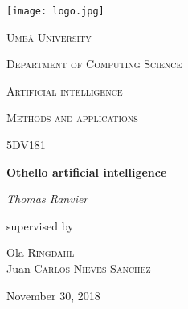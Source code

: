 \begin{titlepage}
    \centering
    \texttt{[image: logo.jpg]} \par\vspace{1cm}
    {\scshape\LARGE Umeå University \par}
    {\scshape\Large Department of Computing Science\par}
    \vspace{1cm}
    {\scshape\Large Artificial intelligence\par}
    {\scshape\Large Methods and applications\par}
    \vspace{0.5cm}
    {\scshape\large 5DV181\par}
    \vspace{1.5cm}
    {\huge\bfseries Othello artificial intelligence\par}
    \vspace{2cm}
    {\Large\itshape Thomas Ranvier\par}
    \vfill 
    {\large supervised by\par}
    Ola \textsc{Ringdahl}
    \\
    Juan \textsc{Carlos Nieves Sanchez}
    \vfill 
    {\large November 30, 2018\par}
\end{titlepage}
